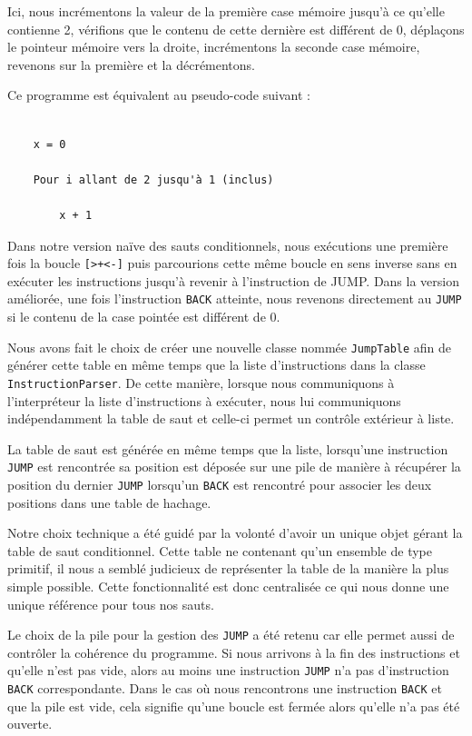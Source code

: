 \documentclass[titlepage]{article}
\begin{document}
    Ici, nous incrémentons la valeur de la première case mémoire jusqu'à ce qu'elle contienne 2, vérifions que le contenu de cette dernière est différent de 0, déplaçons le pointeur mémoire vers la droite, incrémentons la seconde case mémoire, revenons sur la première et la décrémentons.


    Ce programme est équivalent au pseudo-code suivant :

 \begin{verbatim}   

    x = 0

    Pour i allant de 2 jusqu'à 1 (inclus)

        x + 1

\end{verbatim}



    Dans notre version naïve des sauts conditionnels, nous exécutions une première fois la boucle \texttt{[>+<-]} puis parcourions cette même boucle en sens inverse sans en exécuter les instructions jusqu'à revenir à l'instruction de JUMP. Dans la version améliorée, une fois l'instruction \texttt{BACK} atteinte, nous revenons directement au \texttt{JUMP} si le contenu de la case pointée est différent de 0.


    Nous avons fait le choix de créer une nouvelle classe nommée \texttt{JumpTable} afin de générer cette table en même temps que la liste d'instructions dans la classe \texttt{InstructionParser}. De cette manière, lorsque nous communiquons à l'interpréteur la liste d'instructions à exécuter, nous lui communiquons indépendamment la table de saut et celle-ci permet un contrôle extérieur à liste.


    La table de saut est générée en même temps que la liste, lorsqu'une instruction \texttt{JUMP} est rencontrée sa position est déposée sur une pile de manière à récupérer la position du dernier \texttt{JUMP} lorsqu'un \texttt{BACK} est rencontré pour associer les deux positions dans une table de hachage.



    Notre choix technique a été guidé par la volonté d'avoir un unique objet gérant la table de saut conditionnel. Cette table ne contenant qu'un ensemble de type primitif, il nous a semblé judicieux de représenter la table de la manière la plus simple possible. Cette fonctionnalité est donc centralisée ce qui nous donne une unique référence pour tous nos sauts.


    Le choix de la pile pour la gestion des \texttt{JUMP} a été retenu car elle permet aussi de contrôler la cohérence du programme. Si nous arrivons à la fin des instructions et qu'elle n'est pas vide, alors au moins une instruction \texttt{JUMP} n'a pas d'instruction \texttt{BACK} correspondante. Dans le cas où nous rencontrons une instruction \texttt{BACK} et que la pile est vide, cela signifie qu'une boucle est fermée alors qu'elle n'a pas été ouverte.
\end{document}
